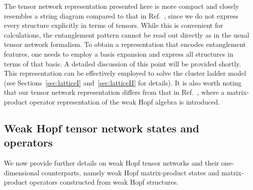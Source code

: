 \documentclass[a4paper,11pt]{article}
\theoremstyle{theorem}
\theoremstyle{remark}
\begin{document}
The tensor network representation presented here is more compact and closely resembles a string diagram compared to that in Ref.~\cite{jia2024generalized}, since we do not express every structure explicitly in terms of tensors. While this is convenient for calculations, the entanglement pattern cannot be read out directly as in the usual tensor network formalism. To obtain a representation that encodes entanglement features, one needs to employ a basis expansion and express all structures in terms of that basis. A detailed discussion of this point will be provided shortly. This representation can be effectively employed to solve the cluster ladder model (see Sections~\ref{sec:latticeI} and~\ref{sec:latticeII} for details).  
It is also worth noting that our tensor network representation differs from that in Ref.~\cite{molnar2022matrix}, where a matrix-product operator representation of the weak Hopf algebra is introduced.



\subsection{Weak Hopf tensor network states and operators}

We now provide further details on weak Hopf tensor networks and their one-dimensional counterparts, namely weak Hopf matrix-product states and matrix-product operators constructed from weak Hopf structures.
\end{document}
